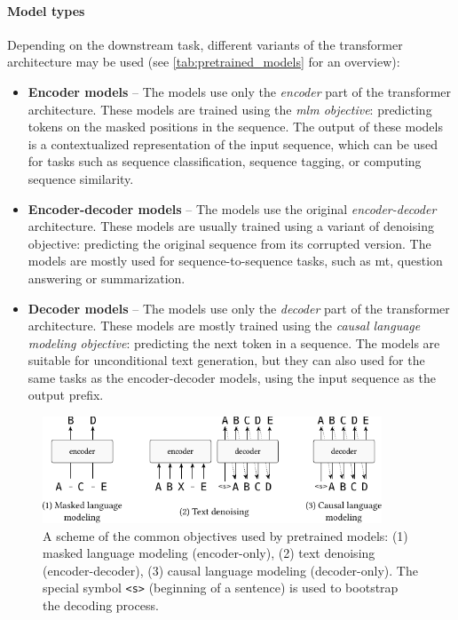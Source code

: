 {\paragraph{Model types} Depending on the downstream task, different variants of the transformer architecture may be used (see \autoref{tab:pretrained_models} for an overview):

\begin{itemize}
  \item \textbf{Encoder models} -- The models use only the \emph{encoder} part of the transformer architecture. These models are trained using the \emph{\ac{mlm} objective}: predicting tokens on the masked positions in the sequence. The output of these models is a contextualized representation of the input sequence, which can be used for tasks such as sequence classification, sequence tagging, or computing sequence similarity.
  \item \textbf{Encoder-decoder models} -- The models use the original \emph{encoder-decoder} architecture. These models are usually trained using a variant of denoising objective: predicting the original sequence from its corrupted version. The models are mostly used for sequence-to-sequence tasks, such as \ac{mt}, question answering or summarization.
  \item \textbf{Decoder models} -- The models use only the \emph{decoder} part of the transformer architecture. These models are mostly trained using the \emph{causal language modeling objective}: predicting the next token in a sequence. The models are suitable for unconditional text generation, but they can also used for the same tasks as the encoder-decoder models, using the input sequence as the output prefix.
\end{itemize}


\begin{figure}[t]
  \centering
  \includegraphics[width=0.9\textwidth]{img/objectives.pdf}

  \caption{A scheme of the common objectives used by pretrained models: (1) masked language modeling (encoder-only), (2) text denoising (encoder-decoder), (3)  causal language modeling (decoder-only). The special symbol \texttt{<s>} (beginning of a sentence) is used to bootstrap the decoding process.}\label{fig:objectives}


\end{figure}}
